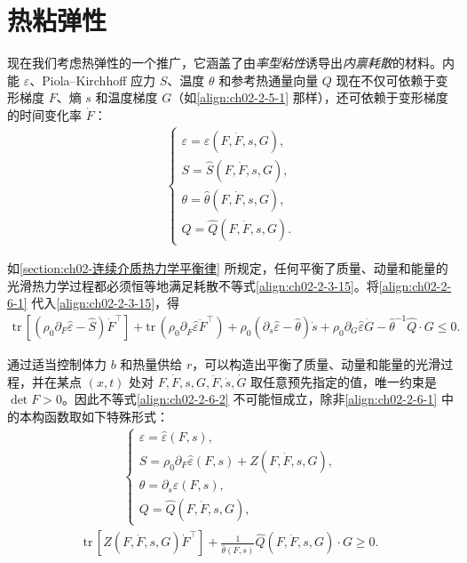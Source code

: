 \documentclass[../../main.tex]{subfiles}
\begin{document}
\section{热粘弹性}\label{section:ch02-热粘弹性}

现在我们考虑热弹性的一个推广，它涵盖了由\emph{率型粘性}诱导出\emph{内禀耗散}的材料。内能 $\varepsilon$、Piola--Kirchhoff 应力 $S$、温度 $\theta$ 和参考热通量向量 $Q$ 现在不仅可依赖于变形梯度 $F$、熵 $s$ 和温度梯度 $G$（如\eqref{align:ch02-2-5-1} 那样），还可依赖于变形梯度的时间变化率 $\dot{F}$：
\begin{align}
\begin{cases}
\varepsilon=\hat{\varepsilon}(F,\dot{F},s,G),\\
S=\hat{S}(F,\dot{F},s,G),\\
\theta=\hat{\theta}(F,\dot{F},s,G),\\
Q=\hat{Q}(F,\dot{F},s,G).
\end{cases}
\label{align:ch02-2-6-1}
\end{align}

如\cref{section:ch02-连续介质热力学平衡律} 所规定，任何平衡了质量、动量和能量的光滑热力学过程都必须恒等地满足耗散不等式\eqref{align:ch02-2-3-15}。将\eqref{align:ch02-2-6-1} 代入\eqref{align:ch02-2-3-15}，得
\begin{align}
\mathrm{tr}\,[(\rho_{0}\partial_{F}\hat{\varepsilon}-\hat{S})\dot{F}^{\top}]+\mathrm{tr}\,(\rho_{0}\partial_{\dot{F}}\hat{\varepsilon}\ddot{F}^{\top})+\rho_{0}(\partial_{s}\hat{\varepsilon}-\hat{\theta})\dot{s}+\rho_{0}\partial_{G}\hat{\varepsilon}\dot{G}-\hat{\theta}^{-1}\hat{Q}\cdot G\leqslant 0.
\label{align:ch02-2-6-2}
\end{align}

通过适当控制体力 $b$ 和热量供给 $r$，可以构造出平衡了质量、动量和能量的光滑过程，并在某点 $(x,t)$ 处对 $F,\dot{F},s,G,\ddot{F},\dot{s},\dot{G}$ 取任意预先指定的值，唯一约束是 $\det F>0$。因此不等式\eqref{align:ch02-2-6-2} 不可能恒成立，除非\eqref{align:ch02-2-6-1} 中的本构函数取如下特殊形式：
\begin{align}
\begin{cases}
\varepsilon=\hat{\varepsilon}(F,s),\\
S=\rho_{0}\partial_{F}\hat{\varepsilon}(F,s)+Z(F,\dot{F},s,G),\\
\theta=\partial_{s}\hat{\varepsilon}(F,s),\\
Q=\hat{Q}(F,\dot{F},s,G),
\end{cases}
\label{align:ch02-2-6-3}
\end{align}
\begin{align}
\mathrm{tr}\,[Z(F,\dot{F},s,G)\dot{F}^{\top}]+\frac{1}{\hat{\theta}(F,s)}\hat{Q}(F,\dot{F},s,G)\cdot G\geqslant 0.
\label{align:ch02-2-6-4}
\end{align}
\end{document}
